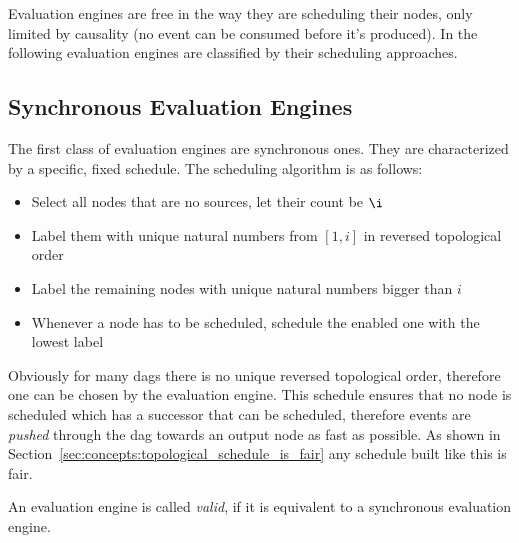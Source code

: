 Evaluation engines are free in the way they are scheduling their nodes, only limited by causality (no event can be consumed before it's produced).
In the following evaluation engines are classified by their scheduling approaches.

\subsection{Synchronous Evaluation Engines}
\label{sec:concepts:behaviour_without_timing:synchronous}

The first class of evaluation engines are synchronous ones.
They are characterized by a specific, fixed schedule.
The scheduling algorithm is as follows:

\begin{itemize}
  \item Select all nodes that are no sources, let their count be \(\i\)
  \item Label them with unique natural numbers from \([1,i]\) in reversed topological order
  \item Label the remaining nodes with unique natural numbers bigger than \(i\)
  \item Whenever a node has to be scheduled, schedule the enabled one with the lowest label
\end{itemize}

Obviously for many \glspl{dag} there is no unique reversed topological order, therefore one can be chosen by the evaluation engine.
This schedule ensures that no node is scheduled which has a successor that can be scheduled, therefore events are \emph{pushed} through the \gls{dag} towards an output node as fast as possible.
As shown in Section~\ref{sec:concepts:topological_schedule_is_fair} any schedule built like this is fair.

\begin{definition}[name = Valid Evaluation Engines]\label{def:valid_eval_engine}
  An evaluation engine is called \emph{valid}, if it is equivalent to a synchronous evaluation engine.
\end{definition}


